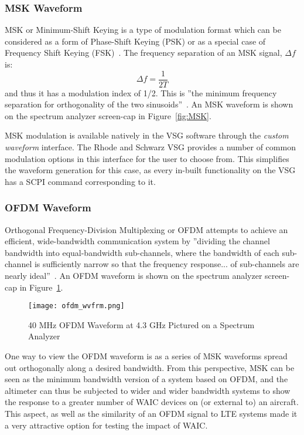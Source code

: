 \subsubsection{MSK Waveform}\label{subsub:MSK}
MSK or Minimum-Shift Keying is a type of modulation format which can be considered as a form of Phase-Shift Keying (PSK) or as a special case of Frequency Shift Keying (FSK)~\cite{proakis_communication_2002}. The frequency separation of an MSK signal, $\Delta f$ is: $$ \Delta f = \frac{1}{2T}$$
and thus it has a modulation index of 1/2. This is ''the minimum frequency separation for orthogonality of the two sinusoids''~\cite{proakis_communication_2002}. An MSK waveform is shown on the spectrum analyzer screen-cap in Figure~\ref{fig:MSK}.

MSK modulation is available natively in the VSG software through the \textit{custom waveform} interface.  The Rhode and Schwarz VSG provides a number of common modulation options in this interface for the user to choose from. This simplifies the waveform generation for this case, as every in-built functionality on the VSG has a SCPI command corresponding to it. 


\subsubsection{OFDM Waveform}\label{subsub:OFDM}

Orthogonal Frequency-Division Multiplexing or OFDM attempts to achieve an efficient, wide-bandwidth communication system by ''dividing the channel bandwidth into equal-bandwidth sub-channels, where the bandwidth of each sub-channel is sufficiently narrow so that the frequency response... of sub-channels are nearly ideal''~\cite{proakis_communication_2002}. An OFDM waveform is shown on the spectrum analyzer screen-cap in Figure~\ref{fig:OFDM}.
\begin{figure}[ht]
\centering
\texttt{[image: ofdm\_wvfrm.png]}
\caption{40 MHz OFDM Waveform at 4.3 GHz Pictured on a Spectrum Analyzer}

\label{fig:OFDM}

\end{figure}
One way to view the OFDM waveform is as a series of MSK waveforms spread out orthogonally along a desired bandwidth. From this perspective, MSK can be seen as the minimum bandwidth version of a system based on OFDM, and the altimeter can thus be subjected to wider and wider bandwidth systems to show the response to a greater number of WAIC devices on (or external to) an aircraft. This aspect, as well as the similarity of an OFDM signal to LTE systems made it a very attractive option for testing the impact of WAIC. 

